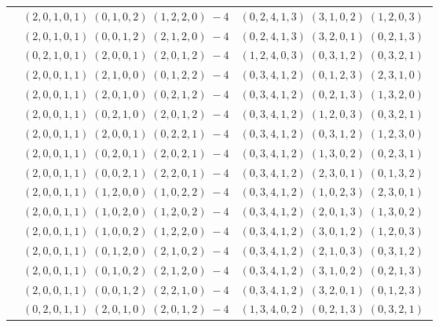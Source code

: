 \documentclass[11pt]{article}
\begin{document}
\begin{longtable}[l]{|c|c|c|}
 \cline{2-3} 
 & $(2 ,0 ,1 ,0 ,1) \;(0 ,1 ,0 ,2) \;(1 ,2 ,2 ,0) \;-4$ & $(0 ,2 ,4 ,1 ,3) \;(3 ,1 ,0 ,2) \;(1 ,2 ,0 ,3) \;$\\ 
 \cline{2-3} 
 & $(2 ,0 ,1 ,0 ,1) \;(0 ,0 ,1 ,2) \;(2 ,1 ,2 ,0) \;-4$ & $(0 ,2 ,4 ,1 ,3) \;(3 ,2 ,0 ,1) \;(0 ,2 ,1 ,3) \;$\\ 
 \cline{2-3} 
 & $(0 ,2 ,1 ,0 ,1) \;(2 ,0 ,0 ,1) \;(2 ,0 ,1 ,2) \;-4$ & $(1 ,2 ,4 ,0 ,3) \;(0 ,3 ,1 ,2) \;(0 ,3 ,2 ,1) \;$\\ 
 \cline{2-3} 
 & $(2 ,0 ,0 ,1 ,1) \;(2 ,1 ,0 ,0) \;(0 ,1 ,2 ,2) \;-4$ & $(0 ,3 ,4 ,1 ,2) \;(0 ,1 ,2 ,3) \;(2 ,3 ,1 ,0) \;$\\ 
 \cline{2-3} 
 & $(2 ,0 ,0 ,1 ,1) \;(2 ,0 ,1 ,0) \;(0 ,2 ,1 ,2) \;-4$ & $(0 ,3 ,4 ,1 ,2) \;(0 ,2 ,1 ,3) \;(1 ,3 ,2 ,0) \;$\\ 
 \cline{2-3} 
 & $(2 ,0 ,0 ,1 ,1) \;(0 ,2 ,1 ,0) \;(2 ,0 ,1 ,2) \;-4$ & $(0 ,3 ,4 ,1 ,2) \;(1 ,2 ,0 ,3) \;(0 ,3 ,2 ,1) \;$\\ 
 \cline{2-3} 
 & $(2 ,0 ,0 ,1 ,1) \;(2 ,0 ,0 ,1) \;(0 ,2 ,2 ,1) \;-4$ & $(0 ,3 ,4 ,1 ,2) \;(0 ,3 ,1 ,2) \;(1 ,2 ,3 ,0) \;$\\ 
 \cline{2-3} 
 & $(2 ,0 ,0 ,1 ,1) \;(0 ,2 ,0 ,1) \;(2 ,0 ,2 ,1) \;-4$ & $(0 ,3 ,4 ,1 ,2) \;(1 ,3 ,0 ,2) \;(0 ,2 ,3 ,1) \;$\\ 
 \cline{2-3} 
 & $(2 ,0 ,0 ,1 ,1) \;(0 ,0 ,2 ,1) \;(2 ,2 ,0 ,1) \;-4$ & $(0 ,3 ,4 ,1 ,2) \;(2 ,3 ,0 ,1) \;(0 ,1 ,3 ,2) \;$\\ 
 \cline{2-3} 
 & $(2 ,0 ,0 ,1 ,1) \;(1 ,2 ,0 ,0) \;(1 ,0 ,2 ,2) \;-4$ & $(0 ,3 ,4 ,1 ,2) \;(1 ,0 ,2 ,3) \;(2 ,3 ,0 ,1) \;$\\ 
 \cline{2-3} 
 & $(2 ,0 ,0 ,1 ,1) \;(1 ,0 ,2 ,0) \;(1 ,2 ,0 ,2) \;-4$ & $(0 ,3 ,4 ,1 ,2) \;(2 ,0 ,1 ,3) \;(1 ,3 ,0 ,2) \;$\\ 
 \cline{2-3} 
 & $(2 ,0 ,0 ,1 ,1) \;(1 ,0 ,0 ,2) \;(1 ,2 ,2 ,0) \;-4$ & $(0 ,3 ,4 ,1 ,2) \;(3 ,0 ,1 ,2) \;(1 ,2 ,0 ,3) \;$\\ 
 \cline{2-3} 
 & $(2 ,0 ,0 ,1 ,1) \;(0 ,1 ,2 ,0) \;(2 ,1 ,0 ,2) \;-4$ & $(0 ,3 ,4 ,1 ,2) \;(2 ,1 ,0 ,3) \;(0 ,3 ,1 ,2) \;$\\ 
 \cline{2-3} 
 & $(2 ,0 ,0 ,1 ,1) \;(0 ,1 ,0 ,2) \;(2 ,1 ,2 ,0) \;-4$ & $(0 ,3 ,4 ,1 ,2) \;(3 ,1 ,0 ,2) \;(0 ,2 ,1 ,3) \;$\\ 
 \cline{2-3} 
 & $(2 ,0 ,0 ,1 ,1) \;(0 ,0 ,1 ,2) \;(2 ,2 ,1 ,0) \;-4$ & $(0 ,3 ,4 ,1 ,2) \;(3 ,2 ,0 ,1) \;(0 ,1 ,2 ,3) \;$\\ 
 \cline{2-3} 
 & $(0 ,2 ,0 ,1 ,1) \;(2 ,0 ,1 ,0) \;(2 ,0 ,1 ,2) \;-4$ & $(1 ,3 ,4 ,0 ,2) \;(0 ,2 ,1 ,3) \;(0 ,3 ,2 ,1) \;$\\ 

\end{longtable}
\end{document}
